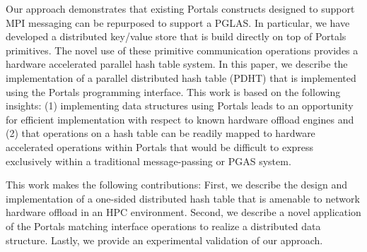 Our approach demonstrates that existing Portals constructs designed to support
MPI messaging can be repurposed to support a PGLAS.  In particular, we have
developed a distributed
key/value store that is build directly on top of Portals
primitives. The novel use of these primitive communication operations
provides a hardware accelerated parallel hash table system. In this
paper, we describe the implementation of a parallel distributed hash
table (PDHT) that is implemented using the Portals programming
interface. This work is based on the following insights: (1)
implementing data structures using Portals leads to an opportunity for
efficient implementation with respect to known hardware offload
engines and (2) that operations on a hash table can be readily mapped
to hardware accelerated operations within Portals that would be
difficult to express exclusively within a traditional message-passing
or PGAS system.

This work makes the following contributions: First, we describe the
design and implementation of a one-sided distributed hash table that
is amenable to network hardware offload in an HPC environment. Second,
we describe a novel application of the Portals matching interface
operations to realize a distributed data structure. Lastly, we provide
an experimental validation of our approach.


